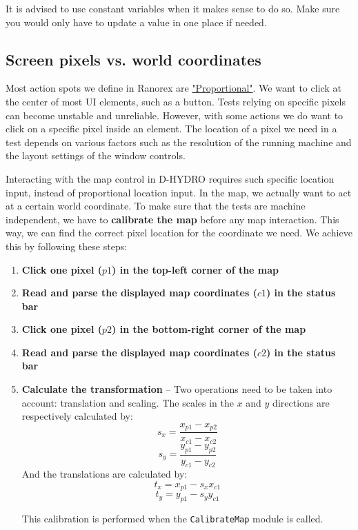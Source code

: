 \documentclass{article}
\newcommand{\inlverb}[1]{\colorbox{cverbbg}{\texttt{#1}}}
\begin{document}
It is advised to use constant variables when it makes sense to do so. Make sure you would only have to update a value in one place if needed.

\subsection{Screen pixels vs. world coordinates}\label{sec:pixelcoords}
Most action spots we define in Ranorex are \href{https://www.ranorex.com/blog/the-action-spot/}{"Proportional"}. We want to click at the center of most UI elements, such as a button. Tests relying on specific pixels can become unstable and unreliable. However, with some actions we do want to click on a specific pixel inside an element. The location of a pixel we need in a test depends on various factors such as the resolution of the running machine and the layout settings of the window controls. 

Interacting with the map control in D-HYDRO requires such specific location input, instead of proportional location input. In the map, we actually want to act at a certain world coordinate. To make sure that the tests are machine independent, we have to \textbf{calibrate the map} before any map interaction. This way, we can find the correct pixel location for the coordinate we need. We achieve this by following these steps:

\begin{enumerate}
    \item \textbf{Click one pixel (\(p1\)) in the top-left corner of the map}
    \item \textbf{Read and parse the displayed map coordinates (\(c1\)) in the status bar}
    \item \textbf{Click one pixel (\(p2\)) in the bottom-right corner of the map}
    \item \textbf{Read and parse the displayed map coordinates (\(c2\)) in the status bar}
    \item \textbf{Calculate the transformation} -- Two operations need to be taken into account: translation and scaling. 
    The scales in the \(x\) and \(y\) directions are respectively calculated by: 
    \begin{equation}
        s_x = \frac{ x_{p1} - x_{p2} } { x_{c1} - x_{c2} }
    \end{equation}
    \begin{equation}
        s_y = \frac{ y_{p1} - y_{p2} } { y_{c1} - y_{c2} }
    \end{equation}
    And the translations are calculated by:
    \begin{equation}
        t_x = x_{p1} - s_x x_{c1}
    \end{equation}
    \begin{equation}
        t_y = y_{p1} - s_y y_{c1}
    \end{equation}
    
    This calibration is performed when the \inlverb{CalibrateMap} module is called.
\end{enumerate}   
    
\end{document}
